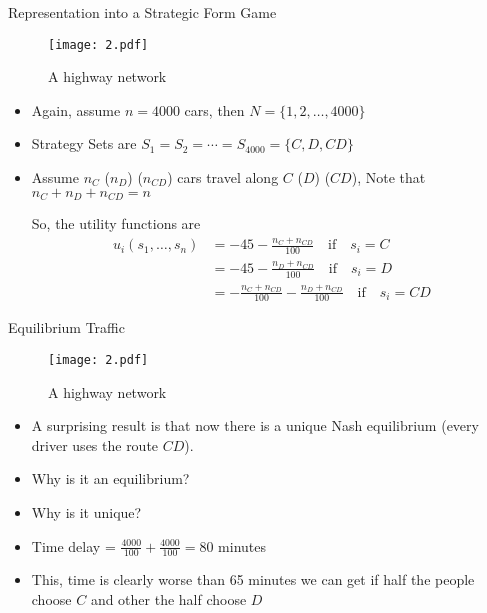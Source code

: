 \documentclass[10pt]{beamer}  %
\begin{document}
\begin{frame}{Representation into a Strategic Form Game}   %
    \begin{figure}
        \centering
        \texttt{[image: 2.pdf]}
        \caption{A highway network}
    \end{figure}
    \begin{itemize}
        \item Again, assume $n=4000$ cars, then $N=\{1,2,\ldots,4000\}$
        \item Strategy Sets are $S_1=S_2=\cdots=S_{4000}=\{C,D,CD\}$
        \item Assume $n_C$ ($n_D$) ($n_{CD}$) cars travel along $C$ ($D$) ($CD$), Note that $n_C+n_D+n_{CD}=n$

        So, the utility functions are
        \begin{align*}
            u_i(s_1,\ldots,s_n)&=-45-\frac{n_C+n_{CD}}{100} \quad \text{if} \quad s_i = C\\
            &=-45-\frac{n_D+n_{CD}}{100} \quad \text{if} \quad s_i = D\\
            &=-\frac{n_C+n_{CD}}{100}-\frac{n_D+n_{CD}}{100} \quad \text{if} \quad s_i = CD
        \end{align*}
    \end{itemize}
\end{frame}

\begin{frame}{Equilibrium Traffic}   %
    \begin{figure}
        \centering
        \texttt{[image: 2.pdf]}
        \caption{A highway network}
    \end{figure}
    \begin{itemize}
        \item A surprising result is that now there is a unique Nash equilibrium (every driver uses the route $CD$).
        \item Why is it an equilibrium?
        \item Why is it unique?
        \item Time delay = $\frac{4000}{100}+\frac{4000}{100}=80$ minutes
        \item This, time is clearly worse than 65 minutes we can get if half the people choose $C$ and other the half choose $D$
    \end{itemize}
\end{frame}
\end{document}
